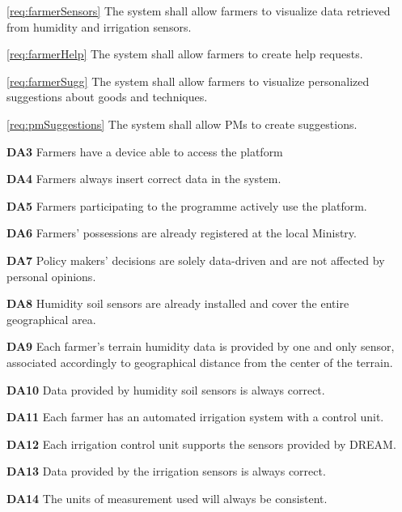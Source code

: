 \documentclass[10pt]{article}
\begin{document}
\begin{description}
\begin{description}
            \item \ref{req:farmerSensors} The system shall allow farmers to visualize data retrieved from humidity and irrigation sensors.
            \item \ref{req:farmerHelp} The system shall allow farmers to create help requests.     
            \item \ref{req:farmerSugg} The system shall allow farmers to visualize personalized suggestions about goods and techniques.
            \item \ref{req:pmSuggestions} The system shall allow PMs to create suggestions.
            \item \textbf{DA3} Farmers have a device able to access the platform
            \item \textbf{DA4} Farmers always insert correct data in the system.
            \item \textbf{DA5} Farmers participating to the programme actively use the platform.
            \item \textbf{DA6} Farmers' possessions are already registered at the local Ministry.
            \item \textbf{DA7} Policy makers' decisions are solely data-driven and are not affected by personal opinions.
            \item \textbf{DA8} Humidity soil sensors are already installed and cover the entire geographical area.
            \item \textbf{DA9} Each farmer's terrain humidity data is provided by one and only sensor, associated accordingly to geographical distance from the center of the terrain.
            \item \textbf{DA10} Data provided by humidity soil sensors is always correct.
            \item \textbf{DA11} Each farmer has an automated irrigation system with a control unit.
            \item \textbf{DA12} Each irrigation control unit supports the sensors provided by DREAM.
            \item \textbf{DA13} Data provided by the irrigation sensors is always correct.
            \item \textbf{DA14} The units of measurement used will always be consistent. 
        \end{description}
\end{description}
\newpage
\end{document}
